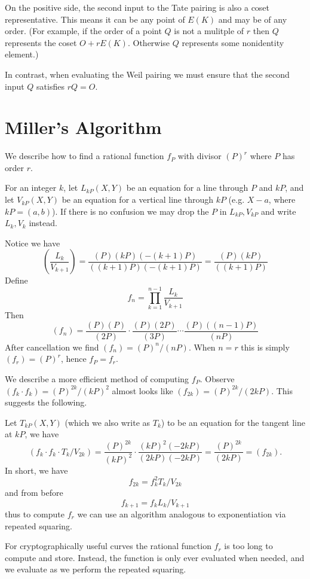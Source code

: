 On the positive side, the second input to the Tate pairing is also a coset
representative. This means it can be any point of $E(K)$ and may
be of any order. (For example,
if the order of a point $Q$ is not a mulitple of $r$ then $Q$ represents
the coset $O + r E(K)$. Otherwise $Q$ represents some nonidentity
element.)

In contrast, when evaluating the Weil pairing we must ensure that the second
input $Q$ satisfies $r Q = O$.

\section {Miller's Algorithm}

We describe how to find a rational function $f_P$ with divisor
$(P)^r$ \cite{miller} where $P$ has order $r$.

For an integer $k$,
let $L_{kP}(X,Y)$ be an equation for a line through $P$ and $kP$,
and let
$V_{kP}(X,Y)$ be an equation for a vertical line through $kP$ (e.g.
$X - a$, where $kP = (a, b)$).
If there is no confusion we may drop the $P$ in $L_{kP}, V_{kP}$ and write
$L_k, V_k$ instead.

Notice we have
\[
\left (
\frac{L_k}{V_{k+1}}
\right )
= \frac{(P)(kP)(-(k+1)P)}{((k+1)P)(-(k+1)P)}
= \frac{(P)(kP)}{((k+1)P)}
\]
Define
\[ f_n = \prod_{k=1}^{n-1} \frac{L_k}{V_{k+1}} \]
Then
\[ (f_n) =
\frac{(P)(P)}{(2P)}
\cdot
\frac{(P)(2P)}{(3P)}
\cdots
\frac{(P)((n-1)P)}{(nP)}
\]
After cancellation we find $(f_n) = (P)^n / (nP)$. When $n = r$ this
is simply $(f_r) = (P)^r$, hence $f_P = f_r$.

We describe a more efficient method of computing $f_P$.
Observe $(f_k \cdot f_k) = {(P)^{2k}}/{(kP)^2}$
almost looks like $(f_{2k}) = {(P)^{2k}}/{(2kP)}$.
This suggests the following.

Let $T_{kP}(X,Y)$ (which we also write as $T_k$)
to be an equation for the tangent line at $kP$,
we have
\[
(f_k \cdot f_k \cdot T_k / V_{2k} ) = \frac{(P)^{2k}}{(kP)^2} \cdot
\frac{(kP)^2 (-2kP)}{(2kP)(-2kP)} = \frac{(P)^{2k}}{(2kP)} = (f_{2k}) .
\]
In short, we have
\[
f_{2k} = f_k^2 T_k / V_{2k}
\]
and from before
\[
f_{k+1} = f_k L_{k} / V_{k+1}
\]
thus to compute $f_r$ we can use an algorithm analogous to exponentiation via
repeated squaring.

For cryptographically useful curves the rational function $f_r$
is too long to compute and store. Instead, the function is only ever
evaluated when needed, and we evaluate as we perform the repeated
squaring.

